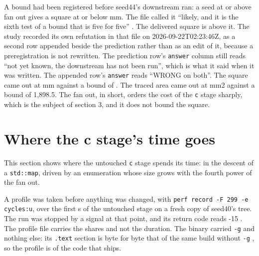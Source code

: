 A bound had been registered before seed44's downstream ran: a seed at or above fan out \FanOutSeedThirtyEight{} gives a square at or below \SeedSquareThirtyEight{} mm. The file called it ``likely, and it is the sixth test of a bound that is five for five'' {}. The delivered square is above it. The study recorded its own refutation in that file on 2026-09-22T02:23:46Z, as a second row appended beside the prediction rather than as an edit of it, because a preregistration is not rewritten. The prediction row's \texttt{answer} column still reads ``not yet known, the downstream has not been run'', which is what it said when it was written. The appended row's \texttt{answer} reads ``WRONG on both''. The square came out at \SeedSquareFortyFour{} mm against a bound of \SeedSquareThirtyEight{}. The traced area came out at \SeedTracedAreaFortyFour{} mm2 against a bound of 1,898.5. The fan out, in short, orders the cost of the \texttt{c} stage sharply, which is the subject of section 3, and it does not bound the square.

\section{Where the c stage's time goes}

This section shows where the untouched \texttt{c} stage spends its time: in the descent of a \texttt{std:\allowbreak{}:\allowbreak{}map}, driven by an enumeration whose size grows with the fourth power of the fan out.

A profile was taken before anything was changed, with \texttt{perf record -\allowbreak{}F 299 -\allowbreak{}e cycles:\allowbreak{}u}, over the first \ProfileBaselineSeconds{} s of the untouched stage on a fresh copy of seed40's tree. The run was stopped by a signal at that point, and its return code reads -15 {}. The profile file carries the shares and not the duration. The binary carried \texttt{-\allowbreak{}g} and nothing else: its \texttt{.\allowbreak{}text} section is byte for byte that of the same build without \texttt{-\allowbreak{}g} {}, so the profile is of the code that ships.

